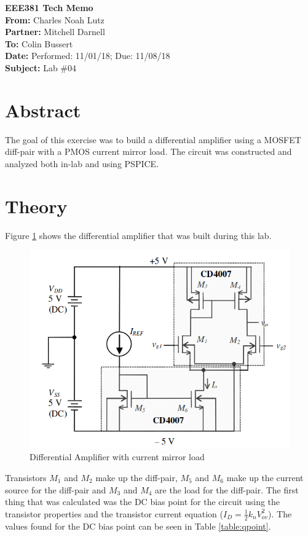 \documentclass[11pt]{article}
\begin{document}
	{\Huge\textbf{EEE381 Tech Memo}}\\
	\hfill \break
	\textbf{From:} Charles Noah Lutz\\
	\textbf{Partner:} Mitchell Darnell\\
	\textbf{To:} Colin Bussert\\
	\textbf{Date:} Performed: 11/01/18; Due: 11/08/18\\
	\textbf{Subject:} Lab \#04

	\section{Abstract}
	The goal of this exercise was to build a differential amplifier using
	a MOSFET diff-pair with a PMOS current mirror load. The circuit was 
	constructed and analyzed both in-lab and using PSPICE. 
	
	\section{Theory}
	Figure \ref{fig:diff-amp} shows the differential amplifier that was
	built during this lab. 

	\begin{figure}[H]
		\centering
		\includegraphics[width=4.0 in]{diff-amp.png}
		\caption{Differential Amplifier with current mirror load}
		\label{fig:diff-amp}
	\end{figure}

	Transistors $M_1$ and $M_2$ make up the diff-pair, $M_5$ and $M_6$
	make up the current source for the diff-pair and $M_3$ and $M_4$ are
	the load for the diff-pair. The first thing that was calculated was the 
	DC bias point for the circuit using the transistor properties and the 
	transistor current equation ($I_D = \frac{1}{2} k_n V_{ov}^2$). The values
	found for the DC bias point can be seen in Table \ref{table:qpoint}.
\end{document}
